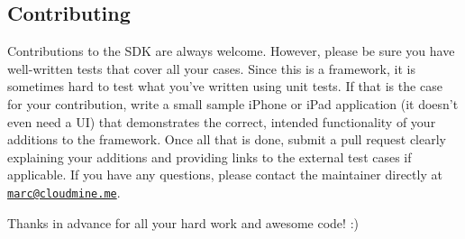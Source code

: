 \subsection*{Contributing}

Contributions to the S\-D\-K are always welcome. However, please be sure you have well-\/written tests that cover all your cases. Since this is a framework, it is sometimes hard to test what you've written using unit tests. If that is the case for your contribution, write a small sample i\-Phone or i\-Pad application (it doesn't even need a U\-I) that demonstrates the correct, intended functionality of your additions to the framework. Once all that is done, submit a pull request clearly explaining your additions and providing links to the external test cases if applicable. If you have any questions, please contact the maintainer directly at \href{mailto:marc@cloudmine.me}{\tt marc@cloudmine.\-me}.

Thanks in advance for all your hard work and awesome code! \-:) 